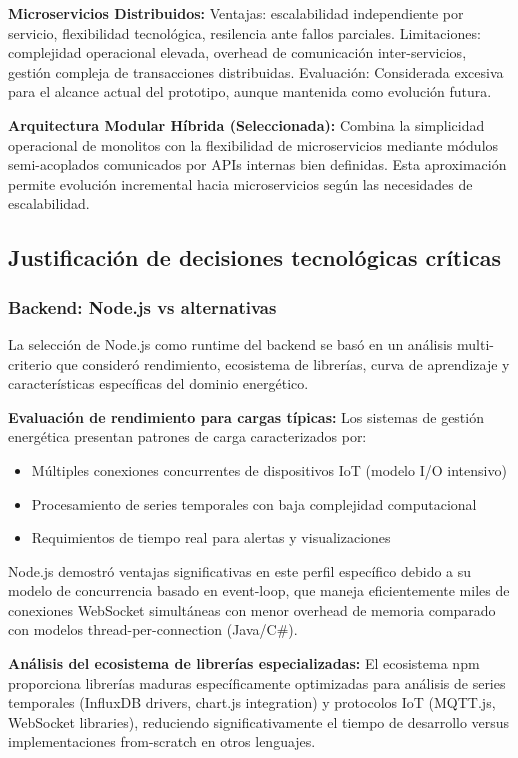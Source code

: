 \textbf{Microservicios Distribuidos:}
Ventajas: escalabilidad independiente por servicio, flexibilidad tecnológica, resilencia ante fallos parciales.
Limitaciones: complejidad operacional elevada, overhead de comunicación inter-servicios, gestión compleja de transacciones distribuidas.
Evaluación: Considerada excesiva para el alcance actual del prototipo, aunque mantenida como evolución futura.

\textbf{Arquitectura Modular Híbrida (Seleccionada):}
Combina la simplicidad operacional de monolitos con la flexibilidad de microservicios mediante módulos semi-acoplados comunicados por APIs internas bien definidas. Esta aproximación permite evolución incremental hacia microservicios según las necesidades de escalabilidad.

\subsection{Justificación de decisiones tecnológicas críticas}

\subsubsection{Backend: Node.js vs alternativas}

La selección de Node.js como runtime del backend se basó en un análisis multi-criterio que consideró rendimiento, ecosistema de librerías, curva de aprendizaje y características específicas del dominio energético.

\textbf{Evaluación de rendimiento para cargas típicas:}
Los sistemas de gestión energética presentan patrones de carga caracterizados por: 
\begin{itemize}
    \item Múltiples conexiones concurrentes de dispositivos IoT (modelo I/O intensivo)
    \item Procesamiento de series temporales con baja complejidad computacional
    \item Requimientos de tiempo real para alertas y visualizaciones
\end{itemize}

Node.js demostró ventajas significativas en este perfil específico debido a su modelo de concurrencia basado en event-loop, que maneja eficientemente miles de conexiones WebSocket simultáneas con menor overhead de memoria comparado con modelos thread-per-connection (Java/C\#).

\textbf{Análisis del ecosistema de librerías especializadas:}
El ecosistema npm proporciona librerías maduras específicamente optimizadas para análisis de series temporales (InfluxDB drivers, chart.js integration) y protocolos IoT (MQTT.js, WebSocket libraries), reduciendo significativamente el tiempo de desarrollo versus implementaciones from-scratch en otros lenguajes.

